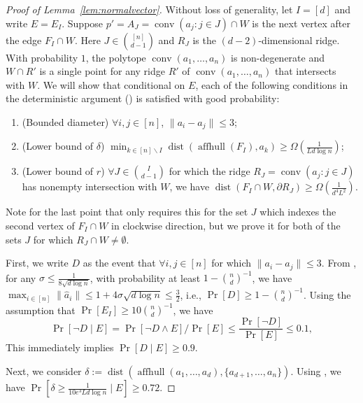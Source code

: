 \documentclass{article}\usepackage[a4paper,margin=20mm]{geometry}
\newcommand{\aff}{\operatorname{affhull}}
\newcommand{\conv}{\operatorname{conv}}
\newcommand{\dist}{\operatorname{dist}}
\begin{document}
\begin{proof}[Proof of Lemma~\ref{lem:normalvector}]
    Without loss of generality, let $I = [d]$ and write $E = E_I$.
    Suppose $p' = A_J = \conv(a_j : j \in J) \cap W$ is the next vertex after the edge $F_I \cap W$.
    Here $J \in \binom{[n]}{d-1}$ and $R_J$ is the $(d-2)$-dimensional ridge.
    With probability $1$, the polytope $\conv(a_1,\dots,a_n)$
    is non-degenerate and $W \cap R'$ is a single point for any ridge $R'$ of $\conv(a_1,\dots,a_n)$ that intersects with $W$.
    We will show that conditional on $E$, each of the following conditions in the deterministic argument () is satisfied with good probability:
    \begin{enumerate}
        \item (Bounded diameter) $\forall i,j\in [n]$, $\|a_i - a_j\| \leq 3$;
        \item (Lower bound of $\delta$) $\min_{k \in [n] \backslash I}\dist(\aff(F_I), a_k) \geq \Omega(\frac{1}{Ld\log n})$;
        \item (Lower bound of $r$) $\forall J \in \binom{I}{d-1}$ for which the ridge
        $R_J = \conv(a_j : j\in J)$ has nonempty intersection with $W$,
        we have $\dist(F_I \cap W, \partial R_J) \geq  \Omega(\frac{1}{d^4L^2})$.
    \end{enumerate}
    Note for the last point that  only requires this for the set $J$
    which indexes the second vertex of $F_I \cap W$ in clockwise direction,
    but we prove it for both of the sets $J$ for which $R_J \cap W \neq \emptyset$.

    First, we write $D$ as the event that $\forall i, j \in [n]$ for which $\|a_i - a_j\| \leq 3$.
    From , for any $\sigma \leq \frac{1}{8\sqrt{d \log n}}$, with probability at least $1 - \binom{n}{d}^{-1}$, we have $\max_{i \in [n]}\|\hat{a}_i\| \leq 1 + 4\sigma \sqrt{d \log n} \leq \frac{3}{2}$, i.e., $\Pr[D] \geq 1 - \binom{n}{d}^{-1}$.
    Using the assumption that $\Pr[E_I] \geq 10\binom{n}{d}^{-1}$, we have
    $$\Pr[\neg D \mid E] = \Pr[\neg D \wedge E]/\Pr[E] \leq \frac{\Pr[\neg D]}{\Pr[E]} \leq 0.1, $$
    This immediately implies $\Pr[D \mid E] \geq 0.9$.

    Next, we consider $\delta := \dist(\aff(a_1,\dots,a_d), \{a_{d+1},\dots,a_n\})$.
    Using , we have $\Pr[\delta \geq \frac{1}{10e^3 Ld\log n} \mid E] \geq 0.72$.


\end{proof}
\end{document}

